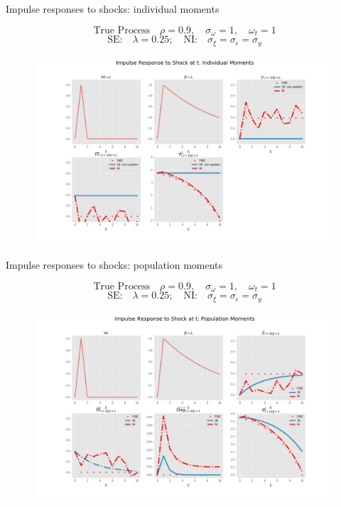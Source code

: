 \documentclass{beamer}
\begin{document}
\begin{frame}{Impulse responses to shocks: individual moments}

$$\textrm{True Process} \quad   \rho=0.9, \quad \sigma_\omega= 1, \quad \omega_t = 1$$
$$ \textrm{SE:} \quad  \lambda = 0.25; \quad \textrm{NI:} \quad \sigma_\xi =  \sigma_\epsilon = \sigma_y$$

\begin{figure}
	\includegraphics[height=0.6\textheight,width=\textwidth]{figuresDraft/ir_indseni} 
\end{figure}

\end{frame}

\begin{frame}{Impulse responses to shocks: population moments}

$$\textrm{True Process} \quad   \rho=0.9, \quad \sigma_\omega= 1, \quad \omega_t = 1$$
$$ \textrm{SE:} \quad  \lambda = 0.25; \quad \textrm{NI:} \quad \sigma_\xi =  \sigma_\epsilon = \sigma_y$$

\begin{figure}
	\includegraphics[height=0.6\textheight,width=\textwidth]{figuresDraft/ir_popseni} 
\end{figure}

\end{frame}
\end{document}
